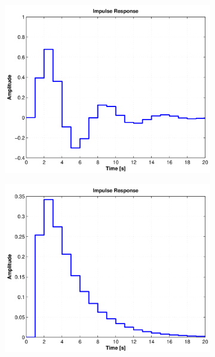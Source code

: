 \documentclass[twoside]{article}
\begin{document}
\begin{figure}[htbp]
    \centering %
\begin{subfigure}{0.25\textwidth}
  \includegraphics[width=\linewidth]{zadani11-a}
  \caption{}
  \label{fig:charakteristiky:a}
\end{subfigure}\hfil %
\begin{subfigure}{0.25\textwidth}
	\includegraphics[width=\linewidth]{zadani11-b}
	\caption{}
	\label{fig:charakteristiky:b}
\end{subfigure}\hfil %
\begin{subfigure}{0.25\textwidth}

\end{subfigure}
\end{figure}
\end{document}
